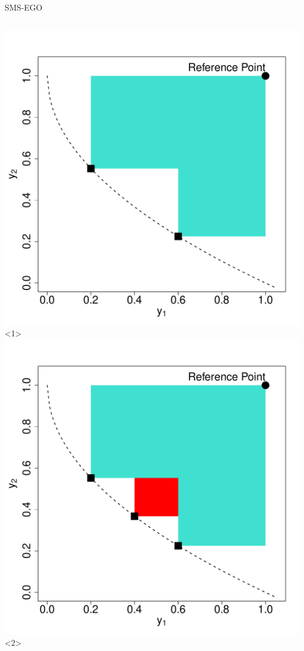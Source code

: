 \documentclass[11pt,compress,t,notes=noshow, xcolor=table]{beamer}
\begin{document}
\begin{frame}{SMS-EGO}
\begin{columns}
\begin{column}{0.45\textwidth}
\includegraphics[page = 1]{figure_man/hv_plot.pdf}<1>
\includegraphics[page = 1]{figure_man/hv_contr_plot.pdf}<2>

\end{column}
\end{columns}
\end{frame}
\end{document}
